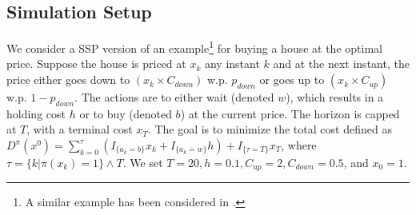\documentclass[11pt,letterpaper,english]{article}
\begin{document}
\subsection{Simulation Setup}  
We consider a SSP version of an example\footnote{A similar example has been considered in \cite{chow2014algorithms}.} for buying a house at the optimal price. Suppose the house is priced at $x_k$ any instant $k$ and at the next instant, the price either goes down to $\left(x_k \times C_{down}\right)$ w.p. $p_{down}$ or goes up to $\left(x_k\times C_{up}\right)$ w.p. $1-p_{down}$. The actions are to either wait (denoted $w$), which results in a holding cost $h$ or to buy (denoted $b$) at the current price. The horizon is capped at $T$, with a terminal cost $x_T$.  The goal is to minimize the total cost defined as $ 
D^{\pi}(x^0)= \sum_{k=0}^\tau \left(I_{\{a_k =b \} }x_k+I_{\{a_k =w \} } h\right) + I_{\{\tau=T\}} x_T$, where $\tau =  \{k | \pi(x_k)=1 \} \wedge T$.
We set $T=20, h=0.1, C_{up}=2, C_{down}=0.5$, and $x_0=1$.  
\end{document}
